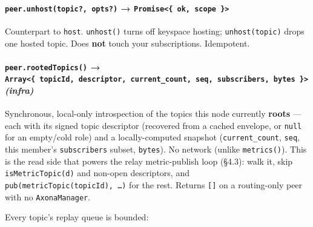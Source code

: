\documentclass[
  nobib]{tufte-handout}
\renewcommand{\subsubsection}[1]{\medskip\par\noindent{\normalsize\bfseries #1}\par\nobreak\smallskip}
\begin{document}
\paragraph{\texorpdfstring{\texttt{peer.unhost(topic?,\ opts?)} →
\texttt{Promise\textless{}\{\ ok,\ scope\ \}\textgreater{}}}{peer.unhost(topic?, opts?) → Promise\textless\{ ok, scope \}\textgreater{}}}\label{peer.unhosttopic-opts-promise-ok-scope}

Counterpart to \texttt{host}. \texttt{unhost()} turns off keyspace
hosting; \texttt{unhost(topic)} drops one hosted topic. Does
\textbf{not} touch your subscriptions. Idempotent.

\paragraph{\texorpdfstring{\texttt{peer.rootedTopics()} →
\texttt{Array\textless{}\{\ topicId,\ descriptor,\ current\_count,\ seq,\ subscribers,\ bytes\ \}\textgreater{}}
\emph{(infra)}}{peer.rootedTopics() → Array\textless\{ topicId, descriptor, current\_count, seq, subscribers, bytes \}\textgreater{} (infra)}}\label{peer.rootedtopics-array-topicid-descriptor-current_count-seq-subscribers-bytes-infra}

Synchronous, local-only introspection of the topics this node currently
\textbf{roots} --- each with its signed topic descriptor (recovered from
a cached envelope, or \texttt{null} for an empty/cold role) and a
locally-computed snapshot (\texttt{current\_count}, \texttt{seq}, this
member's \texttt{subscribers} subset, \texttt{bytes}). No network
(unlike \texttt{metrics()}). This is the read side that powers the relay
metric-publish loop (§4.3): walk it, skip \texttt{isMetricTopic(d)} and
non-open descriptors, and \texttt{pub(metricTopic(topicId),\ …)} for the
rest. Returns \texttt{{[}{]}} on a routing-only peer with no
\texttt{AxonaManager}.

\subsubsection{4.6 topic limits}\label{topic-limits}

Every topic's replay queue is bounded:
\end{document}

